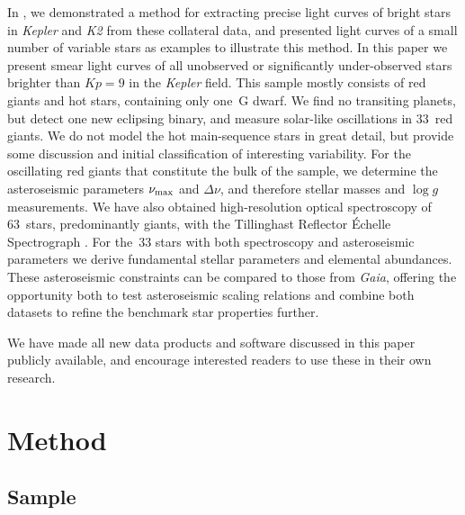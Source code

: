 \documentclass[modern]{aastex62}
\newcommand{\numax}{\mbox{$\nu_{\rm max}$}\xspace}
\newcommand{\Dnu}{\mbox{$\Delta \nu$}\xspace}
\newcommand{\logg}{\mbox{$\log g$}\xspace}
\newcommand{\kepler}{\textit{Kepler}\xspace}
\newcommand{\ktwo}{\textit{K2}\xspace}
\newcommand{\gaia}{\textit{Gaia}\xspace}
\begin{document}
In \citet{smear}, we demonstrated a method for extracting precise light curves of bright stars in \kepler and \ktwo from these collateral data, and presented light curves of a small number of variable stars as examples to illustrate this method. In this paper we present smear light curves of all unobserved or significantly under-observed stars brighter than $Kp=9$ in the \kepler field. This sample mostly consists of red giants and hot stars, containing only one~G dwarf. We find no transiting planets, but detect one new eclipsing binary, and measure solar-like oscillations in 33~red giants. We do not model the hot main-sequence stars in great detail, but provide some discussion and initial classification of interesting variability. For the oscillating red giants that constitute the bulk of the sample, we determine the asteroseismic parameters \numax and \Dnu, and therefore stellar masses and \logg measurements. We have also obtained high-resolution optical spectroscopy of 63~stars, predominantly giants, with the Tillinghast Reflector \'{E}chelle Spectrograph \citep[TRES;][]{2007RMxAC..28..129S}. For the~33 stars with both spectroscopy and asteroseismic parameters we derive fundamental stellar parameters and elemental abundances. These asteroseismic constraints can be compared to those from \gaia, offering the opportunity both to test asteroseismic scaling relations and combine both datasets to refine the benchmark star properties further.

We have made all new data products and software discussed in this paper publicly available, and encourage interested readers to use these in their own research.   

\section{Method}
\label{method}

\subsection{Sample}
\label{sample}
\end{document}
